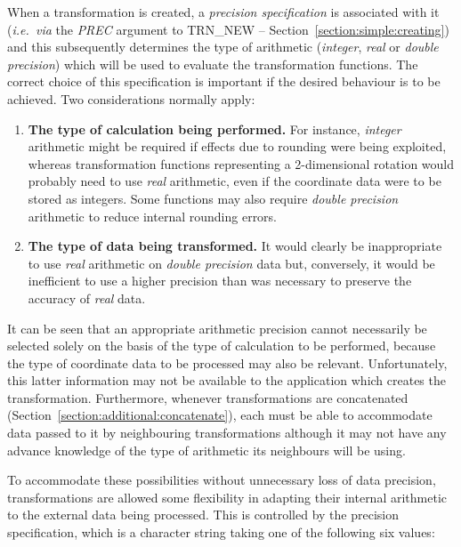 \documentclass[twoside,11pt]{article}
\newcommand{\name}[1]{\mbox{\small{#1}}}
\newcommand{\fortvar}[1]{\mbox{\emph{#1}}}
\begin{document}
When a transformation is created, a \emph{precision specification} is
associated with it (\emph{i.e.\ via} the \fortvar{PREC} argument to
\name{TRN\_NEW} -- Section~\ref{section:simple:creating}) and this
subsequently determines the type of arithmetic (\emph{integer}, \emph{real} or
\emph{double precision}) which will be used to evaluate the transformation
functions. 
The correct choice of this specification is important if the desired
behaviour is to be achieved.
Two considerations normally apply: 

\begin{enumerate} 

\item \textbf{The type of calculation being performed.}
For instance, \emph{integer} arithmetic might be required if effects due to
rounding were being exploited, whereas transformation functions representing
a 2-dimensional rotation would probably need to use \emph{real} arithmetic,
even if the coordinate data were to be stored as integers. 
Some functions may also require \emph{double precision} arithmetic to reduce
internal rounding errors. 

\item \textbf{The type of data being transformed.}
It would clearly be inappropriate to use \emph{real} arithmetic on \emph{double precision} data but, conversely, it would be inefficient to use a
higher precision than was necessary to preserve the accuracy of \emph{real}
data. 

\end{enumerate} 

It can be seen that an appropriate arithmetic precision cannot necessarily
be selected solely on the basis of the type of calculation to be performed,
because the type of coordinate data to be processed may also be relevant.
Unfortunately, this latter information may not be available to the
application which creates the transformation.
Furthermore, whenever transformations are concatenated
(Section~\ref{section:additional:concatenate}), each must be able to
accommodate data passed to it by neighbouring transformations although it
may not have any advance knowledge of the type of arithmetic its neighbours
will be using. 

To accommodate these possibilities without unnecessary loss of data
precision, transformations are allowed some flexibility in adapting their
internal arithmetic to the external data being processed.
This is controlled by the precision specification, which is a character
string taking one of the following six values:
\end{document}
